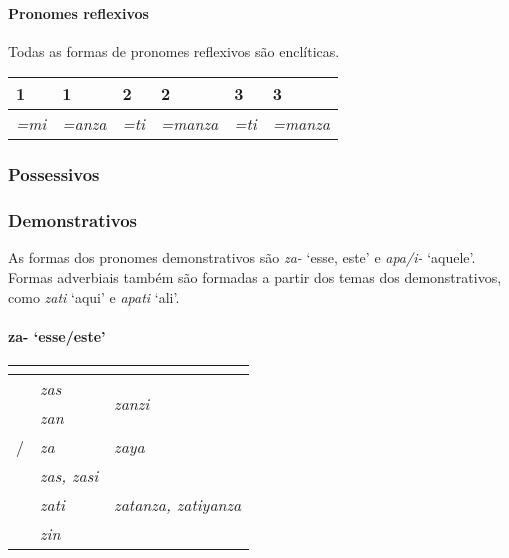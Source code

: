 \paragraph{Pronomes reflexivos}
Todas as formas de pronomes reflexivos são enclíticas.

\begin{center}
	\begin{tabular}[c]{llllll}
		\toprule
		1\Sg{}\emph{} & 1\Pl{}\emph{} & 2\Sg{}\emph{} & 2\Pl{}\emph{} & 3\Sg{}\emph{} & 3\Pl{}\emph{} \\
		\midrule
		\emph{=mi}    & \emph{=anza}  & \emph{=ti}    & \emph{=manza} & \emph{=ti}    & \emph{=manza} \\
		\bottomrule
	\end{tabular}
\end{center}

\subsubsection{Possessivos}

\subsubsection{Demonstrativos}
As formas dos pronomes demonstrativos são \emph{za-} `esse, este' e
\emph{apa\slash{}i-} `aquele'.
Formas adverbiais também são formadas a partir dos temas dos demonstrativos,
como \emph{zati} `aqui' e \emph{apati} `ali'.

\paragraph{za- `esse/este'}

\begin{center}
	\begin{tabular}[c]{lll}
		\toprule
		                 & \Sg{}\emph{}     & \Pl{}\emph{}                    \\
		\midrule
		\Nom{} \Com{}    & \emph{zas}       & \multirow{2}{4em}{\emph{zanzi}} \\
		\Acu{} \Com{}    & \emph{zan}       &                                 \\
		\Nom/\Acu\Neut{} & \emph{za}        & \emph{zaya}                     \\
		\Gen{}           & \emph{zas, zasi} &                                 \\
		\Dat{}           & \emph{zati}      & \emph{zatanza, zatiyanza}       \\
		\Abl{}           & \emph{zin}       & \emph{}                         \\
		\bottomrule
	\end{tabular}
\end{center}

